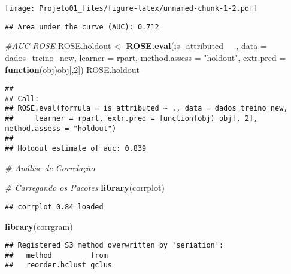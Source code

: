 \documentclass[]{article}
\newenvironment{Shaded}{\begin{snugshade}}{\end{snugshade}}
\newcommand{\CommentTok}[1]{\textcolor[rgb]{0.56,0.35,0.01}{\textit{#1}}}
\newcommand{\ControlFlowTok}[1]{\textcolor[rgb]{0.13,0.29,0.53}{\textbf{#1}}}
\newcommand{\DataTypeTok}[1]{\textcolor[rgb]{0.13,0.29,0.53}{#1}}
\newcommand{\DecValTok}[1]{\textcolor[rgb]{0.00,0.00,0.81}{#1}}
\newcommand{\KeywordTok}[1]{\textcolor[rgb]{0.13,0.29,0.53}{\textbf{#1}}}
\newcommand{\NormalTok}[1]{#1}
\newcommand{\OperatorTok}[1]{\textcolor[rgb]{0.81,0.36,0.00}{\textbf{#1}}}
\newcommand{\StringTok}[1]{\textcolor[rgb]{0.31,0.60,0.02}{#1}}
\begin{document}
\texttt{[image: Projeto01\_files/figure-latex/unnamed-chunk-1-2.pdf]}

\begin{verbatim}
## Area under the curve (AUC): 0.712
\end{verbatim}

\begin{Shaded}
\begin{Highlighting}[]
\CommentTok{#AUC ROSE}
\NormalTok{ROSE.holdout <-}\StringTok{ }\KeywordTok{ROSE.eval}\NormalTok{(is_attributed }\OperatorTok{~}\StringTok{ }\NormalTok{., }
                          \DataTypeTok{data =}\NormalTok{ dados_treino_new, }
                          \DataTypeTok{learner =}\NormalTok{ rpart, }
                          \DataTypeTok{method.assess =} \StringTok{"holdout"}\NormalTok{, }
                          \DataTypeTok{extr.pred =} \ControlFlowTok{function}\NormalTok{(obj)obj[,}\DecValTok{2}\NormalTok{])}
\NormalTok{ROSE.holdout}
\end{Highlighting}
\end{Shaded}

\begin{verbatim}
## 
## Call: 
## ROSE.eval(formula = is_attributed ~ ., data = dados_treino_new, 
##     learner = rpart, extr.pred = function(obj) obj[, 2], method.assess = "holdout")
## 
## Holdout estimate of auc: 0.839
\end{verbatim}

\begin{Shaded}
\begin{Highlighting}[]
\CommentTok{# Análise de Correlação }

\CommentTok{# Carregando os Pacotes}
\KeywordTok{library}\NormalTok{(corrplot)}
\end{Highlighting}
\end{Shaded}

\begin{verbatim}
## corrplot 0.84 loaded
\end{verbatim}

\begin{Shaded}
\begin{Highlighting}[]
\KeywordTok{library}\NormalTok{(corrgram)}
\end{Highlighting}
\end{Shaded}

\begin{verbatim}
## Registered S3 method overwritten by 'seriation':
##   method         from 
##   reorder.hclust gclus
\end{verbatim}
\end{document}
